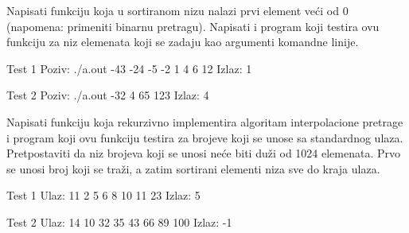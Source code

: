 \begin{Exercise}[label=403]
  Napisati funkciju koja u sortiranom nizu nalazi prvi element veći od
  0 (napomena: primeniti binarnu pretragu). Napisati i program koji
  testira ovu funkciju za niz elemenata koji se zadaju kao argumenti
  komandne linije.
  
\begin{miditest}
\begin{test}{Test 1}
Poziv:  ./a.out -43 -24 -5 -2 1 4 6 12
Izlaz:  1
\end{test}
\end{miditest}

\begin{miditest}
\begin{test}{Test 2}
Poziv:  ./a.out -32 4 65 123
Izlaz:  4
\end{test}
\end{miditest}
  
\end{Exercise}

\begin{Exercise}[label=404]
  Napisati funkciju koja rekurzivno implementira algoritam
  interpolacione pretrage i program koji ovu funkciju testira za
  brojeve koji se unose sa standardnog ulaza. Pretpostaviti da niz
  brojeva koji se unosi neće biti duži od 1024 elemenata. Prvo se
  unosi broj koji se traži, a zatim sortirani elementi niza sve do
  kraja ulaza.
  
\begin{miditest}
\begin{test}{Test 1}
Ulaz:   11 2 5 6 8 10 11 23
Izlaz:  5
\end{test}
\end{miditest}

\begin{miditest}
\begin{test}{Test 2}
Ulaz:   14 10 32 35 43 66 89 100
Izlaz:  -1  
\end{test}
\end{miditest}
  
\end{Exercise}

